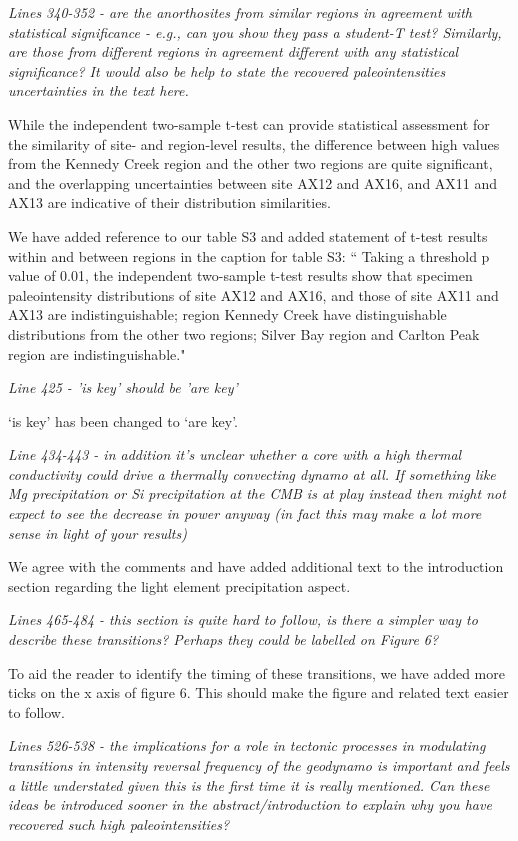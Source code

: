 \documentclass[11pt, letterpaper]{article}
\begin{document}
\begin{flushleft}
\textit{Lines 340-352 - are the anorthosites from similar regions in agreement with statistical significance - e.g., can you show they pass a student-T test? Similarly, are those from different regions in agreement\/ different with any statistical significance? It would also be help to state the recovered paleointensities\/ uncertainties in the text here.}

While the independent two-sample t-test can provide statistical assessment for the similarity of site- and region-level results, the difference between high values from the Kennedy Creek region and the other two regions are quite significant, and the overlapping uncertainties between site AX12 and AX16, and AX11 and AX13 are indicative of their distribution similarities. 

We have added reference to our table S3 and added statement of t-test results within and between regions in the caption for table S3: `` Taking a threshold p value of 0.01, the independent two-sample t-test results show that specimen paleointensity distributions of site AX12 and AX16, and those of site AX11 and AX13 are indistinguishable; region Kennedy Creek have distinguishable distributions from the other two regions; Silver Bay region and Carlton Peak region are indistinguishable."

\textit{Line 425 - 'is key' should be 'are key'}

`is key' has been changed to `are key'. 

\textit{Line 434-443 - in addition it's unclear whether a core with a high thermal conductivity could drive a thermally convecting dynamo at all. If something like Mg precipitation or Si precipitation at the CMB is at play instead then might not expect to see the decrease in power anyway (in fact this may make a lot more sense in light of your results)}

We agree with the comments and have added additional text to the introduction section regarding the light element precipitation aspect. 

\textit{Lines 465-484 - this section is quite hard to follow, is there a simpler way to describe these transitions? Perhaps they could be labelled on Figure 6?}

To aid the reader to identify the timing of these transitions, we have added more ticks on the x axis of figure 6. This should make the figure and related text easier to follow.  

\textit{Lines 526-538 - the implications for a role in tectonic processes in modulating transitions in intensity\/ reversal frequency of the geodynamo is important and feels a little understated given this is the first time it is really mentioned. Can these ideas be introduced sooner in the abstract/introduction to explain why you have recovered such high paleointensities?}


\end{flushleft}
\end{document}
